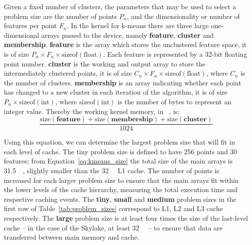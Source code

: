\documentclass[../document.tex]{subfiles}
\begin{document}
Given a fixed number of clusters, the parameters that may be used to select a problem size are the number of points $P_n$, and the dimensionality or number of features per point $F_n$.
In the kernel for k-means there are three large one-dimensional arrays passed to the device, namely {\bf feature}, {\bf cluster} and {\bf membership}.
{\bf feature} is the array which stores the unclustered feature space, it is of size $P_n \times F_n \times \text{sizeof}\left(\text{float}\right)$.
Each feature is represented by a 32-bit floating point number.
{\bf cluster} is the working and output array to store the intermediately clustered points, it is of size $C_n \times F_n \times \text{sizeof}\left(\text{float}\right)$, where $C_n$ is the number of clusters.
{\bf membership} is an array indicating whether each point has changed to a new cluster in each iteration of the algorithm, it is of size $P_n \times \text{sizeof}\left(\text{int}\right)$, where $\text{sizeof}\left(\text{int}\right)$ is the number of bytes to represent an integer value.
Thereby the working kernel memory, in \si{\kibi\byte}, is:
\begin{equation}
    \frac{\text{size}\left(\textbf{feature}\right)+\text{size}\left(\textbf{membership}\right)+\text{size}\left(\textbf{cluster}\right)}{1024}
    \label{eq:kmeans_size}
\end{equation}

Using this equation, we can determine the largest problem size that will fit in each level of cache.
The tiny problem size is defined to have 256 points and 30 features; from Equation~\ref{eq:kmeans_size} the total size of the main arrays is \SI{31.5}{\kibi\byte}, slightly smaller than the \SI{32}{\kibi\byte} L1 cache.
The number of points is increased for each larger problem size to ensure that the main arrays fit within the lower levels of the cache hierarchy, measuring the total execution time and respective caching events.
The {\bf tiny}, {\bf small} and {\bf medium} problem sizes in the first row of Table~\ref{tab:problem_sizes} correspond to L1, L2 and L3 cache respectively.
The {\bf large} problem size is at least four times the size of the last-level cache -- in the case of the Skylake, at least \SI{32}{\mebi\byte} -- to ensure that data are transferred between main memory and cache.

\end{document}
